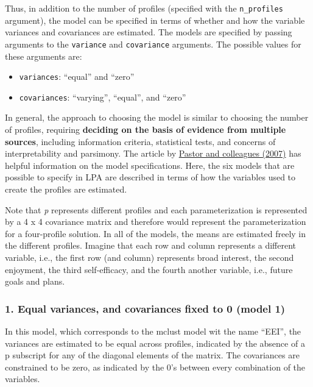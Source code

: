 \documentclass[
  english,
  man]{apa6}
\providecommand{\tightlist}{%
  \setlength{\itemsep}{0pt}\setlength{\parskip}{0pt}}
\begin{document}
Thus, in addition to the number of profiles (specified with the \texttt{n\_profiles}
argument), the model can be specified in terms of whether and how the variable
variances and covariances are estimated. The models are specified by passing arguments to the \texttt{variance} and \texttt{covariance}
arguments. The possible values for these arguments are:

\begin{itemize}
\tightlist
\item
  \texttt{variances}: \enquote{equal} and \enquote{zero}
\item
  \texttt{covariances}: \enquote{varying}, \enquote{equal}, and \enquote{zero}
\end{itemize}

In general, the approach to choosing the model is similar to choosing the number of profiles, requiring \textbf{deciding on the basis of evidence from multiple sources}, including information criteria, statistical tests, and concerns of interpretability and parsimony. The article by \href{https://www.sciencedirect.com/science/article/pii/S0361476X06000543}{Pastor and colleagues (2007)} has helpful information on the model specifications. Here, the six models that are possible to specify in LPA are described in terms of how the variables used to create the profiles are estimated.

Note that \emph{p} represents different profiles and each parameterization is represented by a 4 x 4 covariance matrix and therefore would represent the parameterization for a four-profile solution. In all of the models, the means are estimated freely in the different profiles. Imagine that each row and column represents a different variable, i.e., the first row (and column) represents broad interest, the second enjoyment, the third self-efficacy, and the fourth another variable, i.e., future goals and plans.

\hypertarget{equal-variances-and-covariances-fixed-to-0-model-1}{%
\subsubsection{1. Equal variances, and covariances fixed to 0 (model 1)}\label{equal-variances-and-covariances-fixed-to-0-model-1}}

In this model, which corresponds to the mclust model wit the name \enquote{EEI}, the variances are estimated to be equal across profiles, indicated by the absence of a p subscript for any of the diagonal elements of the matrix. The covariances are constrained to be zero, as indicated by the 0's between every combination of the variables.
\end{document}
